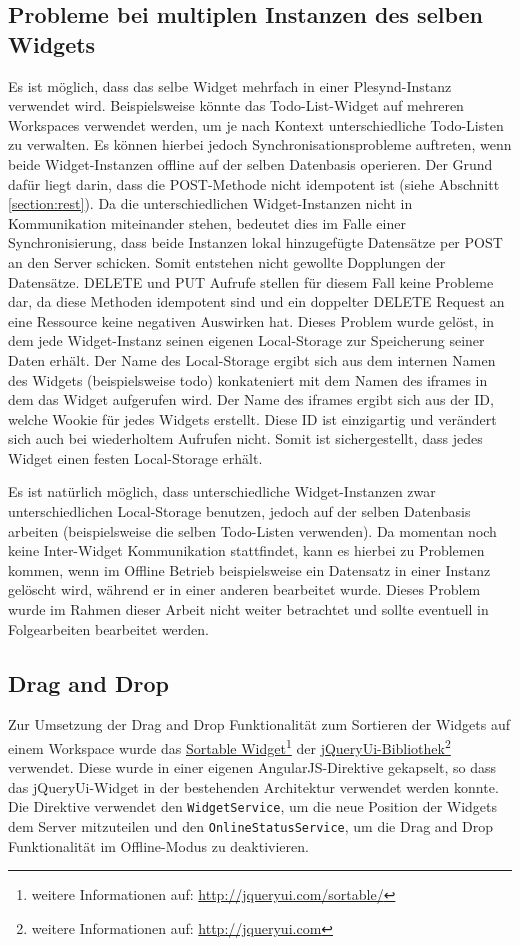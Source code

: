 \subsection{Probleme bei multiplen Instanzen des selben Widgets}
Es ist möglich, dass das selbe Widget mehrfach in einer Plesynd-Instanz verwendet wird. Beispielsweise könnte das Todo-List-Widget auf mehreren Workspaces verwendet werden, um je nach Kontext unterschiedliche Todo-Listen zu verwalten. Es können hierbei jedoch Synchronisationsprobleme auftreten, wenn beide Widget-Instanzen offline auf der selben Datenbasis operieren. Der Grund dafür liegt darin, dass die POST-Methode nicht idempotent ist (siehe Abschnitt \ref{section:rest}). Da die unterschiedlichen Widget-Instanzen nicht in Kommunikation miteinander stehen, bedeutet dies im Falle einer Synchronisierung, dass beide Instanzen lokal hinzugefügte Datensätze per POST an den Server schicken. Somit entstehen nicht gewollte Dopplungen der Datensätze. DELETE und PUT Aufrufe stellen für diesem Fall keine Probleme dar, da diese Methoden idempotent sind und ein doppelter DELETE Request an eine Ressource keine negativen Auswirken hat. Dieses Problem wurde gelöst, in dem jede Widget-Instanz seinen eigenen Local-Storage zur Speicherung seiner Daten erhält. Der Name des Local-Storage ergibt sich aus dem internen Namen des Widgets (beispielsweise todo) konkateniert mit dem Namen des iframes in dem das Widget aufgerufen wird. Der Name des iframes ergibt sich aus der ID, welche Wookie für jedes Widgets erstellt. Diese ID ist einzigartig und verändert sich auch bei wiederholtem Aufrufen nicht. Somit ist sichergestellt, dass jedes Widget einen festen Local-Storage erhält.

Es ist natürlich möglich, dass unterschiedliche Widget-Instanzen zwar unterschiedlichen Local-Storage benutzen, jedoch auf der selben Datenbasis arbeiten (beispielsweise die selben Todo-Listen verwenden). Da momentan noch keine Inter-Widget Kommunikation stattfindet, kann es hierbei zu Problemen kommen, wenn im Offline Betrieb beispielsweise ein Datensatz in einer Instanz gelöscht wird, während er in einer anderen bearbeitet wurde. Dieses Problem wurde im Rahmen dieser Arbeit nicht weiter betrachtet und sollte eventuell in Folgearbeiten bearbeitet werden.

\subsection{Drag and Drop}
Zur Umsetzung der Drag and Drop Funktionalität zum Sortieren der Widgets auf einem Workspace wurde das \href{http://jqueryui.com/sortable/}{Sortable Widget}\footnote{weitere Informationen auf: \url{http://jqueryui.com/sortable/}} der \href{http://jqueryui.com}{jQueryUi-Bibliothek}\footnote{weitere Informationen auf: \url{http://jqueryui.com}} verwendet. Diese wurde in einer eigenen AngularJS-Direktive gekapselt, so dass das jQueryUi-Widget in der bestehenden Architektur verwendet werden konnte. Die Direktive verwendet den \texttt{WidgetService}, um die neue Position der Widgets dem Server mitzuteilen und den \texttt{Online\allowbreak Status\allowbreak Service}, um die Drag and Drop Funktionalität im Offline-Modus zu deaktivieren.

